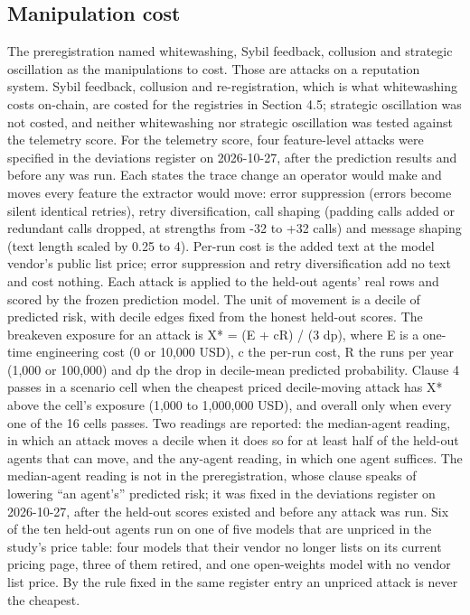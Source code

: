 \documentclass[
  11pt,
  a4paper,
]{article}
\begin{document}
\hypertarget{manipulation-cost}{%
\subsection{Manipulation cost}\label{manipulation-cost}}

The preregistration named whitewashing, Sybil feedback, collusion and
strategic oscillation as the manipulations to cost. Those are attacks on
a reputation system. Sybil feedback, collusion and re-registration,
which is what whitewashing costs on-chain, are costed for the registries
in Section 4.5; strategic oscillation was not costed, and neither
whitewashing nor strategic oscillation was tested against the telemetry
score. For the telemetry score, four feature-level attacks were
specified in the deviations register on 2026-10-27, after the prediction
results and before any was run. Each states the trace change an operator
would make and moves every feature the extractor would move: error
suppression (errors become silent identical retries), retry
diversification, call shaping (padding calls added or redundant calls
dropped, at strengths from -32 to +32 calls) and message shaping (text
length scaled by 0.25 to 4). Per-run cost is the added text at the model
vendor's public list price; error suppression and retry diversification
add no text and cost nothing. Each attack is applied to the held-out
agents' real rows and scored by the frozen prediction model. The unit of
movement is a decile of predicted risk, with decile edges fixed from the
honest held-out scores. The breakeven exposure for an attack is X* = (E
+ cR) / (3 dp), where E is a one-time engineering cost (0 or 10,000
USD), c the per-run cost, R the runs per year (1,000 or 100,000) and dp
the drop in decile-mean predicted probability. Clause 4 passes in a
scenario cell when the cheapest priced decile-moving attack has X* above
the cell's exposure (1,000 to 1,000,000 USD), and overall only when
every one of the 16 cells passes. Two readings are reported: the
median-agent reading, in which an attack moves a decile when it does so
for at least half of the held-out agents that can move, and the
any-agent reading, in which one agent suffices. The median-agent reading
is not in the preregistration, whose clause speaks of lowering ``an
agent's'' predicted risk; it was fixed in the deviations register on
2026-10-27, after the held-out scores existed and before any attack was
run. Six of the ten held-out agents run on one of five models that are
unpriced in the study's price table: four models that their vendor no
longer lists on its current pricing page, three of them retired, and one
open-weights model with no vendor list price. By the rule fixed in the
same register entry an unpriced attack is never the cheapest.
\end{document}
